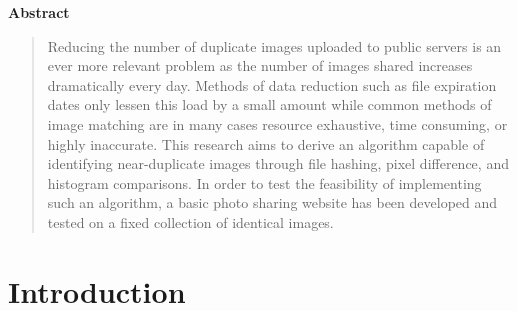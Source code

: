 \documentclass[11pt]{article}
\begin{document}
\begin{center}
\large\bf Abstract
\vspace{-1em}  %
\end{center}


\begin{quote}
Reducing the number of duplicate images uploaded to public servers is an ever more relevant problem as the number of images shared increases dramatically every day. Methods of data reduction such as file expiration dates only lessen this load by a small amount while common methods of image matching are in many cases resource exhaustive, time consuming, or highly inaccurate. This research aims to derive an algorithm capable of identifying near-duplicate images through file hashing, pixel difference, and histogram comparisons. In order to test the feasibility of implementing such an algorithm, a basic photo sharing website has been developed and tested on a fixed collection of identical images.
\end{quote}

\section{Introduction}
\label{sec:introduction}
\vspace*{-.1in}

\end{document}
